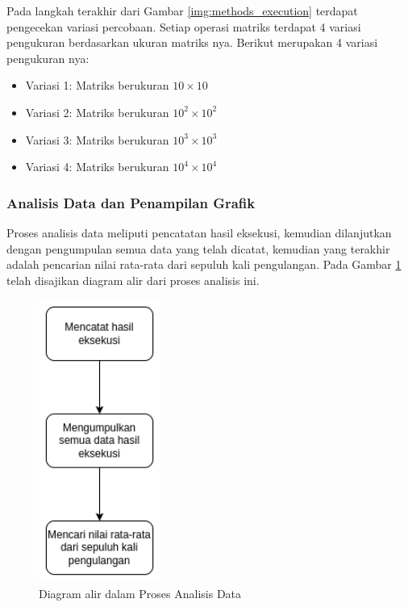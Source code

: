 Pada langkah terakhir dari Gambar \ref{img:methods_execution} terdapat
pengecekan variasi percobaan. Setiap operasi matriks terdapat 4 variasi
pengukuran berdasarkan ukuran matriks nya. Berikut merupakan 4 variasi
pengukuran nya:

\begin{itemize}
  \item Variasi 1: Matriks berukuran $10 \times 10$
  \item Variasi 2: Matriks berukuran $10^2 \times 10^2$
  \item Variasi 3: Matriks berukuran $10^3 \times 10^3$
  \item Variasi 4: Matriks berukuran $10^4 \times 10^4$
\end{itemize}

\subsubsection{Analisis Data dan Penampilan Grafik}

Proses analisis data meliputi pencatatan hasil eksekusi, kemudian dilanjutkan
dengan pengumpulan semua data yang telah dicatat, kemudian yang terakhir adalah
pencarian nilai rata-rata dari sepuluh kali pengulangan. Pada Gambar
\ref{img:methods_analysist} telah disajikan diagram alir dari proses analisis
ini.

\begin{figure}[h]
  \centering
  \includegraphics[width=4cm, scale=1]{schema/langkah-3.drawio.png}
  \caption{Diagram alir dalam Proses Analisis Data}
  \label{img:methods_analysist}
\end{figure}

